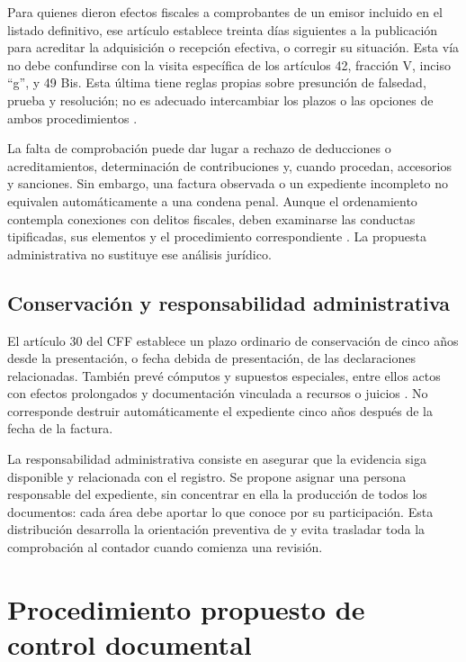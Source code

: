 Para quienes dieron efectos fiscales a comprobantes de un emisor incluido en
el listado definitivo, ese artículo establece treinta días siguientes a la
publicación para acreditar la adquisición o recepción efectiva, o corregir
su situación. Esta vía no debe confundirse con la visita específica de los
artículos 42, fracción V, inciso \enquote{g}, y 49 Bis. Esta última tiene reglas
propias sobre presunción de falsedad, prueba y resolución; no es adecuado
intercambiar los plazos o las opciones de ambos procedimientos
\parencite[arts. 42, 49 Bis y 69-B]{cff2026}.

La falta de comprobación puede dar lugar a rechazo de deducciones o
acreditamientos, determinación de contribuciones y, cuando procedan,
accesorios y sanciones. Sin embargo, una factura observada o un expediente
incompleto no equivalen automáticamente a una condena penal. Aunque el
ordenamiento contempla conexiones con delitos fiscales, deben examinarse
las conductas tipificadas, sus elementos y el procedimiento correspondiente
\parencite[arts. 69-B, 108 y 113 Bis]{cff2026}. La propuesta administrativa
no sustituye ese análisis jurídico.

\subsection{Conservación y responsabilidad administrativa}

El artículo 30 del CFF establece un plazo ordinario de conservación de cinco
años desde la presentación, o fecha debida de presentación, de las
declaraciones relacionadas. También prevé cómputos y supuestos especiales,
entre ellos actos con efectos prolongados y documentación vinculada a recursos
o juicios \parencite[art. 30]{cff2026}. No corresponde destruir
automáticamente el expediente cinco años después de la fecha de la factura.

La responsabilidad administrativa consiste en asegurar que la evidencia siga
disponible y relacionada con el registro. Se propone asignar una persona
responsable del expediente, sin concentrar en ella la producción de todos
los documentos: cada área debe aportar lo que conoce por su participación.
Esta distribución desarrolla la orientación preventiva de
\textcite{rico2023mecanismo} y evita trasladar toda la comprobación al contador
cuando comienza una revisión.

\section{Procedimiento propuesto de control documental}

